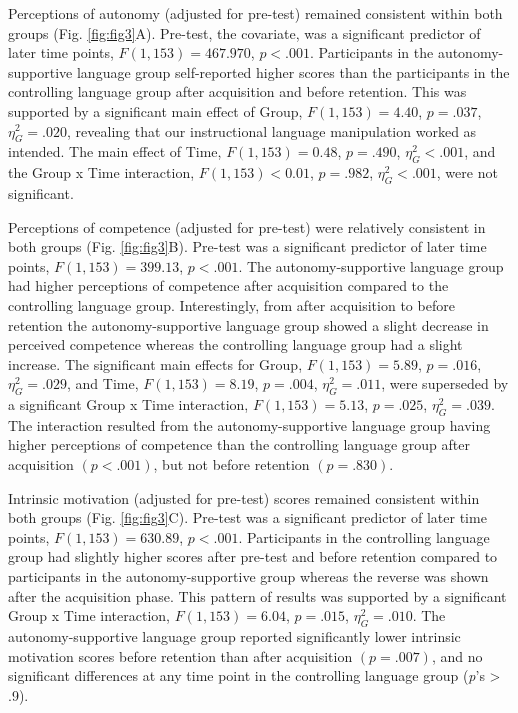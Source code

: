 \documentclass[
  man, donotrepeattitle,mask,floatsintext]{apa7}
\begin{document}
Perceptions of autonomy (adjusted for pre-test) remained consistent within both groups (Fig. \ref{fig:fig3}A). Pre-test, the covariate, was a significant predictor of later time points, \(F(1, 153) = 467.970\), \(p < .001\). Participants in the autonomy-supportive language group self-reported higher scores than the participants in the controlling language group after acquisition and before retention. This was supported by a significant main effect of Group, \(F(1, 153) = 4.40\), \(p = .037\), \(\eta_{G}^2 = .020\), revealing that our instructional language manipulation worked as intended. The main effect of Time, \(F(1, 153) = 0.48\), \(p = .490\), \(\eta_{G}^2 < .001\), and the Group x Time interaction, \(F(1, 153) < 0.01\), \(p = .982\), \(\eta_{G}^2 < .001\), were not significant.

Perceptions of competence (adjusted for pre-test) were relatively consistent in both groups (Fig. \ref{fig:fig3}B). Pre-test was a significant predictor of later time points, \(F(1, 153) = 399.13\), \(p < .001\). The autonomy-supportive language group had higher perceptions of competence after acquisition compared to the controlling language group. Interestingly, from after acquisition to before retention the autonomy-supportive language group showed a slight decrease in perceived competence whereas the controlling language group had a slight increase. The significant main effects for Group, \(F(1, 153) = 5.89\), \(p = .016\), \(\eta_{G}^2 = .029\), and Time, \(F(1, 153) = 8.19\), \(p = .004\), \(\eta_{G}^2 = .011\), were superseded by a significant Group x Time interaction, \(F(1, 153) = 5.13\), \(p = .025\), \(\eta_{G}^2 = .039\). The interaction resulted from the autonomy-supportive language group having higher perceptions of competence than the controlling language group after acquisition \((p < .001)\), but not before retention \((p = .830)\).

Intrinsic motivation (adjusted for pre-test) scores remained consistent within both groups (Fig. \ref{fig:fig3}C). Pre-test was a significant predictor of later time points, \(F(1, 153) = 630.89\), \(p < .001\). Participants in the controlling language group had slightly higher scores after pre-test and before retention compared to participants in the autonomy-supportive group whereas the reverse was shown after the acquisition phase. This pattern of results was supported by a significant Group x Time interaction, \(F(1, 153) = 6.04\), \(p = .015\), \(\eta_{G}^2 = .010\). The autonomy-supportive language group reported significantly lower intrinsic motivation scores before retention than after acquisition \((p = .007)\), and no significant differences at any time point in the controlling language group (\emph{p}'s \textgreater{} .9).
\end{document}
